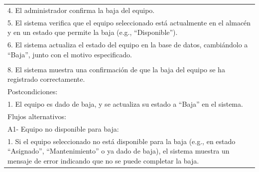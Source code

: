 \documentclass[stu, 12pt, letterpaper, donotrepeattitle, floatsintext, natbib]{apa7}
\begin{document}
\begin{longtable}{@{} p{16.5cm} @{}}
    4. El administrador confirma la baja del equipo.                                                                                                                                                                                    \\
    5. El sistema verifica que el equipo seleccionado est\'a actualmente en el almac\'en y en un estado que permite la baja (e.g., ``Disponible'').                                                                                     \\
    6. El sistema actualiza el estado del equipo en la base de datos, cambi\'andolo a ``Baja'', junto con el motivo especificado.                                                                                                       \\                                                                                                                     \\
    8. El sistema muestra una confirmaci\'on de que la baja del equipo se ha registrado correctamente.                                                                                                                                  \\ \midrule
    Postcondiciones:                                                                                                                                                                                                                    \\
    1. El equipo es dado de baja, y se actualiza su estado a ``Baja'' en el sistema.                                                                                                                                                    \\ \midrule
    Flujos alternativos:                                                                                                                                                                                                                \\
    A1- Equipo no disponible para baja:                                                                                                                                                                                                 \\
    \hspace{1cm}1. Si el equipo seleccionado no est\'a disponible para la baja (e.g., en estado ``Asignado'', ``Mantenimiento'' o ya dado de baja), el sistema muestra un mensaje de error indicando que no se puede completar la baja. \\

\end{longtable}
\end{document}
